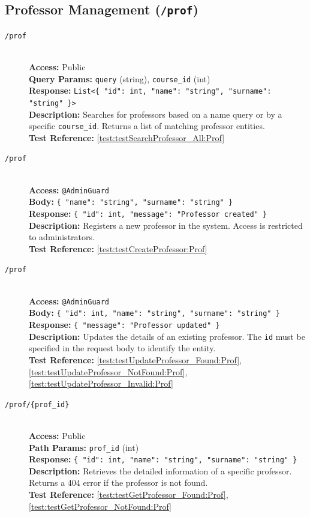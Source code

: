 \subsection{Professor Management (\texttt{/prof})}
\begin{description}
	\item[\GET \quad \texttt{/prof}] \hfill \\
	\textbf{Access:} Public \\
	\textbf{Query Params:} \texttt{query} (string), \texttt{course\_id} (int) \\
	\textbf{Response:} \texttt{List<\{ "id": int, "name": "string", "surname": "string" \}>} \\
	\textbf{Description:} Searches for professors based on a name query or by a specific \texttt{course\_id}. Returns a list of matching professor entities.\\
	\textbf{Test Reference:} \ref{test:testSearchProfessor_All:Prof}
	
	\item[\POST \quad \texttt{/prof}] \hfill \\
	\textbf{Access:} \texttt{@AdminGuard} \\
	\textbf{Body:} \texttt{\{ "name": "string", "surname": "string" \}} \\
	\textbf{Response:} \texttt{\{ "id": int, "message": "Professor created" \}} \\
	\textbf{Description:} Registers a new professor in the system. Access is restricted to administrators.\\
	\textbf{Test Reference:} \ref{test:testCreateProfessor:Prof}
	
	\item[\PUT \quad \texttt{/prof}] \hfill \\
	\textbf{Access:} \texttt{@AdminGuard} \\
	\textbf{Body:} \texttt{\{ "id": int, "name": "string", "surname": "string" \}} \\
	\textbf{Response:} \texttt{\{ "message": "Professor updated" \}} \\
	\textbf{Description:} Updates the details of an existing professor. The \texttt{id} must be specified in the request body to identify the entity.\\
	\textbf{Test Reference:} \ref{test:testUpdateProfessor_Found:Prof}, \ref{test:testUpdateProfessor_NotFound:Prof}, \ref{test:testUpdateProfessor_Invalid:Prof}
	
	\item[\GET \quad \texttt{/prof/\{prof\_id\}}] \hfill \\
	\textbf{Access:} Public \\
	\textbf{Path Params:} \texttt{prof\_id} (int) \\
	\textbf{Response:} \texttt{\{ "id": int, "name": "string", "surname": "string" \}} \\
	\textbf{Description:} Retrieves the detailed information of a specific professor. Returns a 404 error if the professor is not found.\\
	\textbf{Test Reference:} \ref{test:testGetProfessor_Found:Prof}, \ref{test:testGetProfessor_NotFound:Prof}
	

\end{description}
